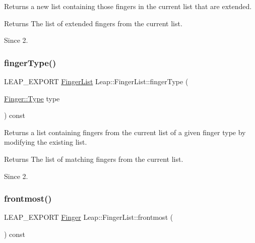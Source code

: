 Returns a new list containing those fingers in the current list that are extended.


\begin{DoxyCodeInclude}
\end{DoxyCodeInclude}


\begin{DoxyReturn}{Returns}
The list of extended fingers from the current list. 
\end{DoxyReturn}
\begin{DoxySince}{Since}
2. 
\end{DoxySince}
\mbox{\label{class_leap_1_1_finger_list_a2fbb5276be9f22c9f35589b0a0b5d8eb}} 
\subsubsection{\texorpdfstring{finger\+Type()}{fingerType()}}
{\footnotesize\ttfamily L\+E\+A\+P\+\_\+\+E\+X\+P\+O\+RT \hyperlink{class_leap_1_1_finger_list}{Finger\+List} Leap\+::\+Finger\+List\+::finger\+Type (\begin{DoxyParamCaption}\item[{\hyperlink{class_leap_1_1_finger_a1e94681e6d2168b2f854fcad7c8ac483}{Finger\+::\+Type}}]{type }\end{DoxyParamCaption}) const}

Returns a list containing fingers from the current list of a given finger type by modifying the existing list.


\begin{DoxyCodeInclude}
\end{DoxyCodeInclude}


\begin{DoxyReturn}{Returns}
The list of matching fingers from the current list. 
\end{DoxyReturn}
\begin{DoxySince}{Since}
2. 
\end{DoxySince}
\mbox{\label{class_leap_1_1_finger_list_ac3f85628d7815422b6b61c3d5d61fe4a}} 
\subsubsection{\texorpdfstring{frontmost()}{frontmost()}}
{\footnotesize\ttfamily L\+E\+A\+P\+\_\+\+E\+X\+P\+O\+RT \hyperlink{class_leap_1_1_finger}{Finger} Leap\+::\+Finger\+List\+::frontmost (\begin{DoxyParamCaption}{ }\end{DoxyParamCaption}) const}

